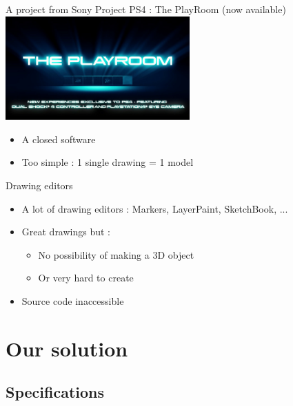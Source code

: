 \documentclass[a4paper,10pt]{beamer}
\begin{document}
		\begin{frame}{A project from Sony}
			Project PS4 : The PlayRoom (now available)
			\href{run:Video_intro_playroom.wmv}{\includegraphics[width=200pt]{images/The-Playroom.jpg}}
			\begin{itemize}
				\item A closed software
				\item Too simple : 1 single drawing = 1 model

			\end{itemize}
		\end{frame}
		
			\begin{frame}{Drawing editors}
				\begin{itemize}
					\item A lot of drawing editors : Markers, LayerPaint, SketchBook, ...
					\item Great drawings but :
					\begin{itemize}
						\item No possibility of making a 3D object
						\item Or very hard to create
					\end{itemize}
					\item Source code inaccessible
				\end{itemize}
			\end{frame}
	
	\section{Our solution}
		\subsection{Specifications}
		
\end{document}
